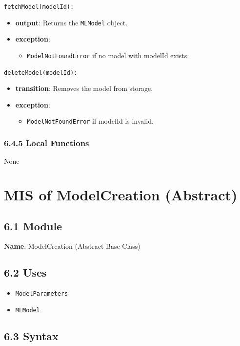 \documentclass[12pt, titlepage]{article}
\begin{document}
\noindent \texttt{fetchModel(modelId):}
\begin{itemize}
    \item \textbf{output}: Returns the \texttt{MLModel} object.
    \item \textbf{exception}:
    \begin{itemize}
        \item \texttt{ModelNotFoundError} if no model with modelId exists.
    \end{itemize}
\end{itemize}

\noindent \texttt{deleteModel(modelId):}
\begin{itemize}
    \item \textbf{transition}: Removes the model from storage.
    \item \textbf{exception}:
    \begin{itemize}
        \item \texttt{ModelNotFoundError} if modelId is invalid.
    \end{itemize}
\end{itemize}

\subsubsection{6.4.5 Local Functions}
None

\newpage


\section{MIS of ModelCreation (Abstract)}
\label{sec:ModelCreationAbstract}

\subsection{6.1 Module}
\textbf{Name}: ModelCreation (Abstract Base Class)

\subsection{6.2 Uses}
\begin{itemize}
    \item \texttt{ModelParameters}
    \item \texttt{MLModel}
\end{itemize}

\subsection{6.3 Syntax}
\end{document}
